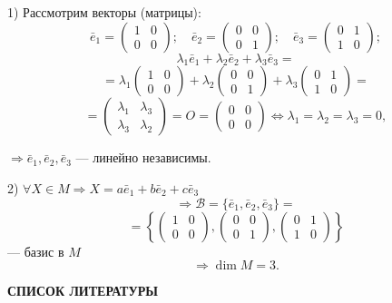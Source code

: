 \documentclass[12pt,a4paper]{article}
\newcommand{\ve}{\bar e}
\begin{document}
1) Рассмотрим векторы (матрицы):
$$
\ve_1 =
\begin{pmatrix} 1 & 0 \\ 0 & 0
\end{pmatrix}; \quad \ve_2 =
\begin{pmatrix} 0 & 0 \\ 0 & 1
\end{pmatrix}; \quad \ve_3 =
\begin{pmatrix} 0 & 1 \\ 1 & 0
\end{pmatrix};
$$
$$
\lambda_1 \ve_1 + \lambda_2 \ve_2 + \lambda_3 \ve_3 =
$$
$$
= \lambda_1
\begin{pmatrix} 1 & 0 \\ 0 & 0
\end{pmatrix} + \lambda_2
\begin{pmatrix} 0 & 0 \\ 0 & 1
\end{pmatrix} + \lambda_3
\begin{pmatrix} 0 & 1 \\ 1 & 0
\end{pmatrix} =
$$
$$
=
\begin{pmatrix} \lambda_1 & \lambda_3 \\ \lambda_3 & \lambda_2
\end{pmatrix} = O =
\begin{pmatrix} 0 & 0 \\ 0 & 0
\end{pmatrix} \Leftrightarrow \lambda_1 = \lambda_2 = \lambda_3 = 0,
$$

$\Rightarrow \ve_1, \ve_2, \ve_3$ --- линейно независимы.

2) $\forall X \in M \Rightarrow X = a \ve_1 + b \ve_2 + c \ve_3$
$$
\Rightarrow \mathcal{B} = \{\ve_1, \ve_2, \ve_3\} =
$$
$$
= \left\{
\begin{pmatrix} 1 & 0 \\ 0 & 0
\end{pmatrix},
\begin{pmatrix} 0 & 0 \\ 0 & 1
\end{pmatrix},
\begin{pmatrix} 0 & 1 \\ 1 & 0
\end{pmatrix} \right\}
$$
--- базис в $M$
$$
\Rightarrow \dim M = 3.
$$

\newpage

\begin{center}
\textbf{СПИСОК ЛИТЕРАТУРЫ}
\end{center}
\end{document}
